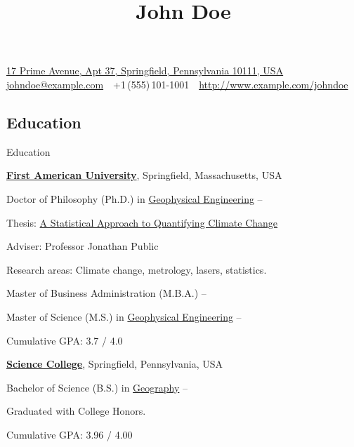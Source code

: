 \documentclass[a4paper,10pt,oneside]{article}
\begin{document}

\title{John Doe}

\begin{subtitle}
\href{https://maps.google.com/maps?q=1+North+Avenue,+Apt+42,+Springfield,+Pennsylvania+12345,+USA}
{17 Prime Avenue, Apt 37, Springfield, Pennsylvania 10111, USA}
\\
\href{mailto:johndoe@example.com}
{johndoe@example.com}
\,\bulletsymbol\,
+1\,(555)\,101-1001
\,\bulletsymbol\,
\href{http://www.example.com/johndoe}
{http://www.example.com/johndoe}
\end{subtitle}

\begin{body}


\section{Education}
{Education}

\href{http://www.example.com/my-university}
{\textbf{First American University}},
Springfield, Massachusetts, USA
\par
\entrygap
Doctor of Philosophy (Ph.D.) in
\href{http://www.example.com/my-department}
{Geophysical Engineering}
\hfill
{} --
\begin{detail}
Thesis:
\href{http://www.example.com/my-phd-thesis}
{A Statistical Approach to Quantifying Climate Change}
\par
Adviser:
Professor Jonathan Public
\par
Research areas:
Climate change, metrology, lasers, statistics.
\end{detail}
\entrygap
Master of Business Administration (M.B.A.)
\hfill
{} --
\par
\entrygap
Master of Science (M.S.) in
\href{http://www.example.com/my-department}
{Geophysical Engineering}
\hfill
{} --
\begin{detail}
Cumulative GPA: 3.7 / 4.0
\end{detail}

\nextentry
\href{http://www.example.com/my-college}
{\textbf{Science College}},
Springfield, Pennsylvania, USA
\par
Bachelor of Science (B.S.) in
\href{http://www.example.com/my-department}
{Geography}
\hfill
{} --
\begin{detail}
Graduated with College Honors.
\par
Cumulative GPA: 3.96 / 4.00
\end{detail}


\end{body}
\end{document}
